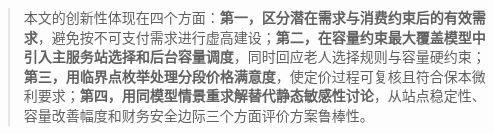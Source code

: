 \begin{abstract}
本文的创新性体现在四个方面：\textbf{第一，区分潜在需求与消费约束后的有效需求}，避免按不可支付需求进行虚高建设；\textbf{第二，在容量约束最大覆盖模型中引入主服务站选择和后台容量调度}，同时回应老人选择规则与容量硬约束；\textbf{第三，用临界点枚举处理分段价格满意度}，使定价过程可复核且符合保本微利要求；\textbf{第四，用同模型情景重求解替代静态敏感性讨论}，从站点稳定性、容量改善幅度和财务安全边际三个方面评价方案鲁棒性。

\end{abstract}
